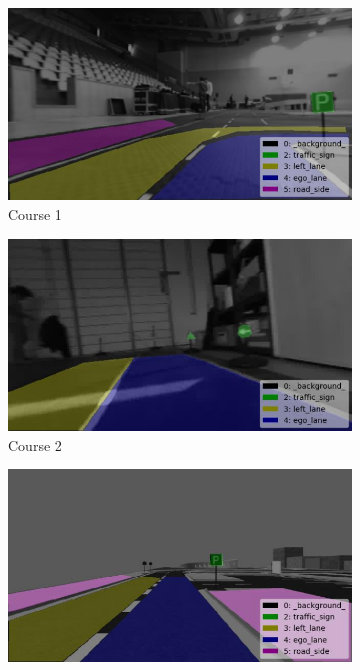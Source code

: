 \begin{figure}[h]
  \centering
  \begin{subfigure}[b]{0.4\linewidth}
    \includegraphics[width=\linewidth]{figures/course1.jpg}
    \caption{Course 1}
  \end{subfigure}
  \begin{subfigure}[b]{0.4\linewidth}
    \includegraphics[width=\linewidth]{figures/course2.jpg}
    \caption{Course 2}
  \end{subfigure}
  \begin{subfigure}[b]{0.4\linewidth}
    \includegraphics[width=\linewidth]{figures/course3.jpg}

\end{subfigure}
\end{figure}
